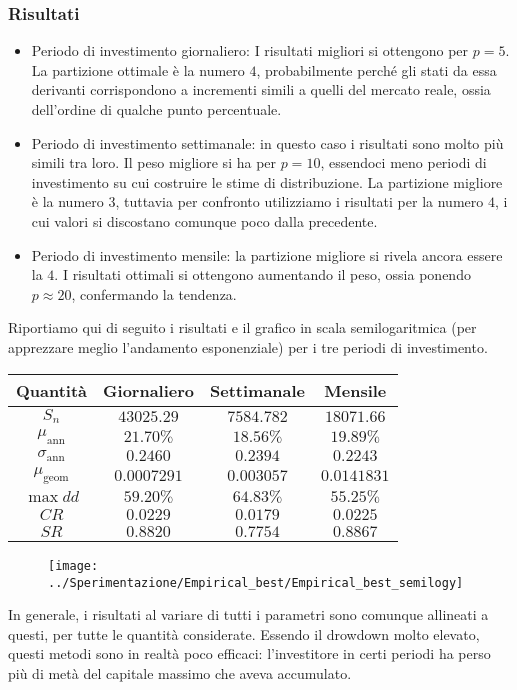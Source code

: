 \documentclass[a4paper,11pt]{book}
\theoremstyle{plain}
\theoremstyle{definition}
\theoremstyle{remark}
\begin{document}
\subsubsection{Risultati}
\begin{itemize}
	\item Periodo di investimento giornaliero: I risultati migliori si ottengono per $p=5$. La partizione ottimale è la numero $4$, probabilmente perché gli stati da essa derivanti corrispondono a incrementi simili a quelli del mercato reale, ossia dell'ordine di qualche punto percentuale.
	\item Periodo di investimento settimanale: in questo caso i risultati sono molto più simili tra loro. Il peso migliore si ha per $p=10$, essendoci meno periodi di investimento su cui costruire le stime di distribuzione. La partizione migliore è la numero $3$, tuttavia per confronto utilizziamo i risultati per la numero $4$, i cui valori si discostano comunque poco dalla precedente.
	\item Periodo di investimento mensile: la partizione migliore si rivela ancora essere la $4$. I risultati ottimali si ottengono aumentando il peso, ossia ponendo $p\approx20$, confermando la tendenza.
\end{itemize}
Riportiamo qui di seguito i risultati e il grafico in scala semilogaritmica (per apprezzare meglio l'andamento esponenziale) per i tre periodi di investimento.
\begin{table}[H]
	\centering
	\begin{tabular}{|c|c|c|c|}
		\hline
		Quantità 			  & Giornaliero	 & Settimanale	& Mensile		\\\hline
		$S_n$                 & $43025.29$   & $7584.782$	& $18071.66$ 	\\
		$\mu_{\text{ann}}$    & $21.70\%$    & $18.56\%$	& $19.89\%$		\\
		$\sigma_{\text{ann}}$ & $0.2460$     & $0.2394$		& $0.2243$		\\
		$\mu_{\text{geom}}$   & $0.0007291$  & $0.003057$	& $0.0141831$	\\
		$\max dd$             & $59.20\%$    & $64.83\%$	& $55.25\%$		\\
		$CR$                  & $0.0229$     & $0.0179$		& $0.0225$		\\
		$SR$                  & $0.8820$     & $0.7754$		& $0.8867$		\\\hline
	\end{tabular}
\end{table}
\begin{figure}[H]
\centering
\texttt{[image: ../Sperimentazione/Empirical\_best/Empirical\_best\_semilogy]}
\caption{}
\label{fig:empiricalbestsemilogy}
\end{figure}
In generale, i risultati al variare di tutti i parametri sono comunque allineati a questi, per tutte le quantità considerate. Essendo il drowdown molto elevato, questi metodi sono in realtà poco efficaci: l'investitore in certi periodi ha perso più di metà del capitale massimo che aveva accumulato.
\end{document}
